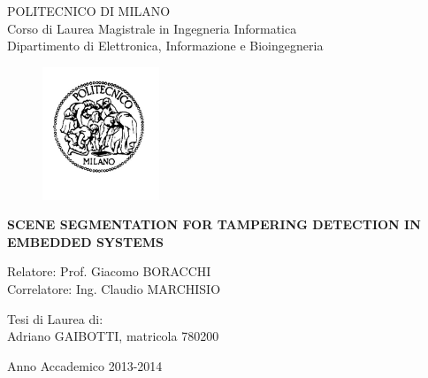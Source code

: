 \thispagestyle{empty}
\vspace*{-1.5cm} \bfseries{
\begin{center}
  \large
  POLITECNICO DI MILANO\\
  \normalsize
  Corso di Laurea Magistrale in Ingegneria Informatica\\
  Dipartimento di Elettronica, Informazione e Bioingegneria\\
  \begin{figure}[htbp]
    \begin{center}
      \includegraphics[width=3.5cm]{./pictures/logopm}
    \end{center}
  \end{figure}
  \vspace*{0.3cm} \LARGE



  \textbf{SCENE SEGMENTATION FOR TAMPERING DETECTION IN EMBEDDED SYSTEMS}\\



\end{center}
\vspace*{3.0cm} \large
\begin{flushleft}


	Relatore: Prof. Giacomo BORACCHI \\
	Correlatore: Ing. Claudio MARCHISIO\\

  

\end{flushleft}
\vspace*{1.0cm}
\begin{flushright}


  Tesi di Laurea di:\\ Adriano GAIBOTTI, matricola 780200 \\ 
		       


\end{flushright}
\vspace*{0.5cm}
\begin{center}



  Anno Accademico 2013-2014
\end{center} \clearpage
}
